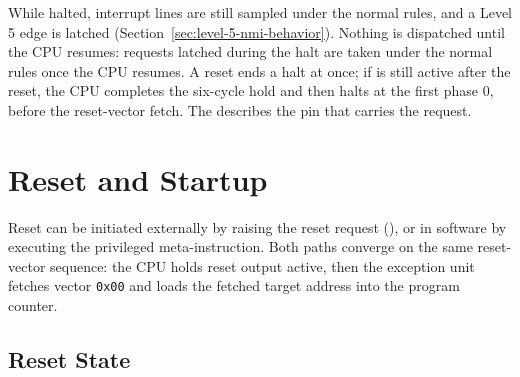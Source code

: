 While halted, interrupt lines are still sampled under the normal rules, and a Level 5 edge is latched
(Section~\ref{sec:level-5-nmi-behavior}). Nothing is dispatched until the CPU resumes: requests latched during the halt
are taken under the normal rules once the CPU resumes. A reset ends a halt at once; if  is still active
after the reset, the CPU completes the six-cycle  hold and then halts at the first phase 0, before the
reset-vector fetch. The \hwmanual{} describes the pin that carries the request.

\section{Reset and Startup}

Reset can be initiated externally by raising the reset request (), or in software by executing the
privileged  meta-instruction. Both paths converge on the same reset-vector sequence: the CPU holds reset
output active, then the exception unit fetches vector \texttt{0x00} and loads the fetched target address into the
program counter.

\subsection{Reset State}

